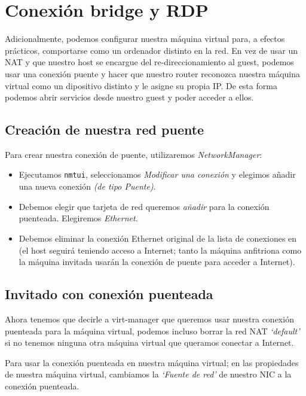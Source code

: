 \documentclass[11pt]{article}
\begin{document}
\section{Conexión bridge y RDP}

Adicionalmente, podemos configurar nuestra máquina virtual para, a efectos prácticos, comportarse como un ordenador distinto en la red. En vez de usar un NAT y que nuestro host se encargue del re-direccionamiento al guest, podemos usar una conexión puente y hacer que nuestro router reconozca nuestra máquina virtual como un dipositivo distinto y le asigne su propia IP. De esta forma podemos abrir servicios desde nuestro guest y poder acceder a ellos.

\subsection{Creación de nuestra red puente}

Para crear nuestra conexión de puente, utilizaremos \emph{NetworkManager}:

\begin{itemize}
	\item Ejecutamos \texttt{nmtui}, seleccionamos \emph{Modificar una conexión} y elegimos añadir una nueva conexión \emph{(de tipo Puente)}.
	\item Debemos elegir que tarjeta de red queremos \emph{añadir} para la conexión puenteada. Elegiremos \emph{Ethernet}.
	\item Debemos eliminar la conexión Ethernet original de la lista de conexiones en (el host seguirá teniendo acceso a Internet; tanto la máquina anfitriona como la máquina invitada usarán la conexión de puente para acceder a Internet).
\end{itemize}

\subsection{Invitado con conexión puenteada}

Ahora tenemos que decirle a virt-manager que queremos usar nuestra conexión puenteada para la máquina virtual, podemos incluso borrar la red NAT \emph{`default'} si no tenemos ninguna otra máquina virtual que queramos conectar a Internet.

\medskip
Para usar la conexión puenteada en nuestra máquina virtual; en las propiedades de nuestra máquina virtual, cambiamos la \emph{`Fuente de red'} de nuestro NIC a la conexión puenteada.
\end{document}
